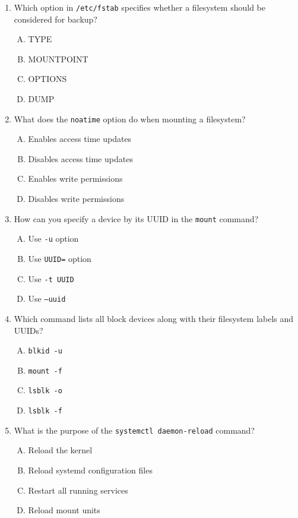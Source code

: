 \documentclass[a4paper]{report}
\begin{document}
\begin{enumerate}[1.]
    \item Which option in \texttt{/etc/fstab} specifies whether a filesystem should be considered for backup?  
    \begin{enumerate}[A)]
        \item TYPE  
        \item MOUNTPOINT  
        \item OPTIONS  
        \item DUMP  
    \end{enumerate}

    \item What does the \texttt{noatime} option do when mounting a filesystem?  
    \begin{enumerate}[A)]
        \item Enables access time updates  
        \item Disables access time updates  
        \item Enables write permissions  
        \item Disables write permissions  
    \end{enumerate}

    \item How can you specify a device by its UUID in the \texttt{mount} command?  
    \begin{enumerate}[A)]
        \item Use \texttt{-u} option  
        \item Use \texttt{UUID=} option  
        \item Use \texttt{-t UUID}  
        \item Use \texttt{--uuid}  
    \end{enumerate}

    \item Which command lists all block devices along with their filesystem labels and UUIDs?  
    \begin{enumerate}[A)]
        \item \texttt{blkid -u}  
        \item \texttt{mount -f}  
        \item \texttt{lsblk -o}  
        \item \texttt{lsblk -f}  
    \end{enumerate}

    \item What is the purpose of the \texttt{systemctl daemon-reload} command?  
    \begin{enumerate}[A)]
        \item Reload the kernel  
        \item Reload systemd configuration files  
        \item Restart all running services  
        \item Reload mount units  
    \end{enumerate}


\end{enumerate}
\end{document}
